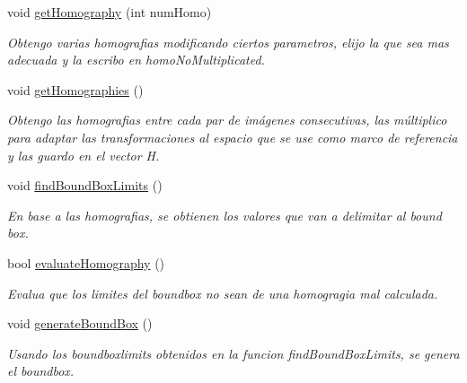 \begin{DoxyCompactItemize}
void \mbox{\hyperlink{classuav_1_1Stitcher_aafe09514806435e6258d8740b9f6c122}{get\+Homography}} (int num\+Homo)
\begin{DoxyCompactList}\small\item\em Obtengo varias homografias modificando ciertos parametros, elijo la que sea mas adecuada y la escribo en homo\+No\+Multiplicated. \end{DoxyCompactList}\item 
\mbox{\label{classuav_1_1Stitcher_a9dde85d6912b1868a2da36abf84184a9}} 
void \mbox{\hyperlink{classuav_1_1Stitcher_a9dde85d6912b1868a2da36abf84184a9}{get\+Homographies}} ()
\begin{DoxyCompactList}\small\item\em Obtengo las homografias entre cada par de imágenes consecutivas, las múltiplico para adaptar las transformaciones al espacio que se use como marco de referencia y las guardo en el vector H. \end{DoxyCompactList}\item 
\mbox{\label{classuav_1_1Stitcher_a9a1b51dde72c48576b5d5ced0edc087b}} 
void \mbox{\hyperlink{classuav_1_1Stitcher_a9a1b51dde72c48576b5d5ced0edc087b}{find\+Bound\+Box\+Limits}} ()
\begin{DoxyCompactList}\small\item\em En base a las homografias, se obtienen los valores que van a delimitar al bound box. \end{DoxyCompactList}\item 
bool \mbox{\hyperlink{classuav_1_1Stitcher_a90039daf32275b9b9a4d7820e7a6a929}{evaluate\+Homography}} ()
\begin{DoxyCompactList}\small\item\em Evalua que los limites del boundbox no sean de una homogragia mal calculada. \end{DoxyCompactList}\item 
\mbox{\label{classuav_1_1Stitcher_a47deddeee449c53103b85082be7171df}} 
void \mbox{\hyperlink{classuav_1_1Stitcher_a47deddeee449c53103b85082be7171df}{generate\+Bound\+Box}} ()
\begin{DoxyCompactList}\small\item\em Usando los boundboxlimits obtenidos en la funcion find\+Bound\+Box\+Limits, se genera el boundbox. \end{DoxyCompactList}\item 

\end{DoxyCompactItemize}
